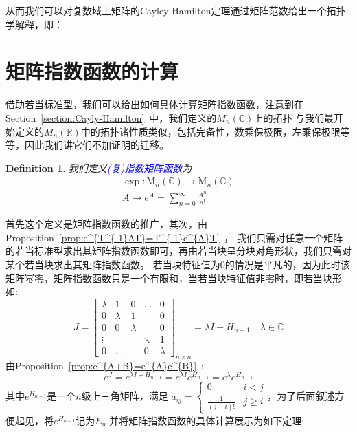 \documentclass[a4paper,12pt]{ctexart}
\newtheorem{defn}{Definition}[section]
\newcommand{\bb}[1]{\mathbb{#1}}
\begin{document}
从而我们可以对复数域上矩阵的Cayley-Hamilton定理通过矩阵范数给出一个拓扑学解释，即：
\begin{center}
    \textcolor{blue}{}
\end{center}

\section{矩阵指数函数的计算}
借助若当标准型，我们可以给出如何具体计算矩阵指数函数，注意到在Section~\ref{section:Cayly-Hamilton}~中，我们定义的$M_n(\bb{C})$上的拓扑
与我们最开始定义的$M_n(\bb{R})$中的拓扑诸性质类似，包括完备性，数乘保极限，左乘保极限等等，因此我们讲它们不加证明的迁移。
\begin{defn}
    我们定义\textcolor{blue}{(复)指数矩阵函数}为
    \begin{align*}
        \exp : \text{M}_n(\mathbb{C})\rightarrow \text{M}_n(\mathbb{C}) \\
        A\rightarrow e^{A}=\sum_{n=0}^{\infty} \frac{A^n}{n!}
    \end{align*}
\end{defn}
首先这个定义是矩阵指数函数的推广，其次，由Proposition~\ref{prop:e^{T^{-1}AT}=T^{-1}e^{A}T}~，
我们只需对任意一个矩阵的若当标准型求出其矩阵指数函数即可，再由若当块呈分块对角形状，我们只需对某个若当块求出其矩阵指数函数。
若当块特征值为$0$的情况是平凡的，因为此时该矩阵幂零，矩阵指数函数只是一个有限和，当若当块特征值非零时，即若当块形如:
\begin{equation*}
    J= \begin{bmatrix}
        \lambda & 1       & 0       & \dots  & 0       \\
        0       & \lambda & 1       &        & 0       \\
        0       & 0       & \lambda &        & 0       \\
        \vdots  &         &         & \ddots & 1       \\
        0       & \dots   &         & 0      & \lambda
    \end{bmatrix}_{n\times n}=\lambda I+H_{n-1}\quad \lambda \in \bb{C}
\end{equation*}
由Proposition~\ref{prop:e^{A+B}=e^{A}e^{B}}~:
\begin{equation*}
    e^{J}=e^{\lambda I+H_{n-1}}=e^{\lambda I}e^{H_{n-1}}=e^{\lambda}e^{H_{n-1}}
\end{equation*}
其中$e^{H_{n-1}}$是一个$n$级上三角矩阵，满足
$a_{ij}=\begin{cases}
        0                & i<j    \\
        \frac{1}{(j-i)!} & j\ge i
    \end{cases}$，为了后面叙述方便起见，将$e^{H_{n-1}}$记为$E_n$,并将矩阵指数函数的具体计算展示为如下定理:
\end{document}
